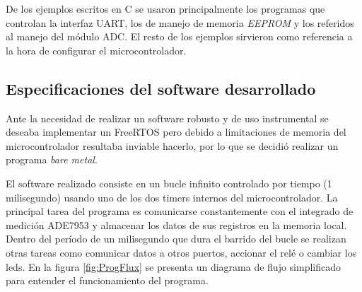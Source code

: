 De los ejemplos escritos en C  se usaron principalmente los programas que controlan la interfaz UART,  los de manejo de memoria \textit{EEPROM} y los referidos al manejo del módulo ADC. El resto de los ejemplos sirvieron como referencia a la hora de configurar el microcontrolador.





\subsection{Especificaciones del software desarrollado}

Ante la necesidad de realizar un software robusto y de uso instrumental se deseaba implementar un FreeRTOS pero debido a limitaciones de memoria del microcontrolador resultaba inviable hacerlo, por lo que se decidió realizar un programa \textit{bare metal}.

El software realizado consiste en un bucle infinito controlado por tiempo (1 milisegundo) usando uno de los dos timers internos del microcontrolador. La principal tarea del programa es comunicarse constantemente con el integrado de medición ADE7953 y almacenar los datos de sus registros en la memoria local. Dentro del período de un milisegundo que dura el barrido del bucle se realizan otras tareas como comunicar datos a otros puertos, accionar el relé o cambiar los leds. En la figura \ref{fig:ProgFlux} se presenta un diagrama de flujo simplificado para entender el funcionamiento del programa.

